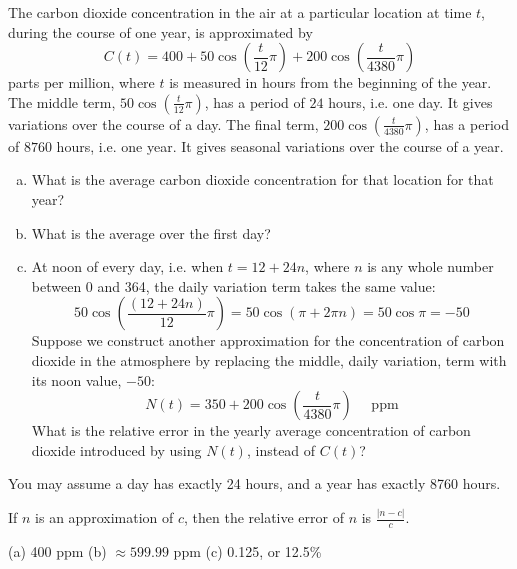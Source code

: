 \begin{Mquestion}
The carbon dioxide concentration in the air at a particular location at time $t$, during the course of one year, is approximated by \[C(t) = 400+50\cos\left(\frac{t}{12}\pi\right)+200\cos\left(\frac{t}{4380}\pi\right)\] parts per million, where  $t$ is measured in hours from the beginning of the year. 
The middle term, $50\cos\left(\frac{t}{12}\pi\right)$, has a period of $24$ hours, i.e. one day. It gives variations
over the course of a day.
The final term, $200\cos\left(\frac{t}{4380}\pi\right)$, has a period of $8760$ hours, i.e. one year. It gives 
seasonal variations over the course of a year.
\begin{enumerate}[(a)]
\item  What is the average carbon dioxide concentration for that location for that year?
\item What is the average over the first day? 
\item At noon of every day, i.e. when $t=12+24n$, where $n$ is any whole number between 0 and 364,
the daily variation term takes the same value:
\[ 
50\cos\left(\frac{(12+24n)}{12}\pi\right) = 50\cos\left(\pi+2\pi n\right) = 50\cos\pi=-50
\]
Suppose we construct another approximation for the concentration of carbon dioxide in the atmosphere by replacing the 
middle, daily variation, term with its noon value, $-50$:
\[N(t) = 350 +200\cos\left(\frac{t}{4380}\pi\right)\quad\text{ ppm}\]
What is the relative error in the yearly average concentration of carbon dioxide introduced by using $N(t)$, instead of $C(t)$?
\end{enumerate}
You may assume a day has exactly 24 hours, and a year has exactly 8760 hours.
\end{Mquestion}
\begin{hint}
If $n$ is an approximation of $c$, then the relative error of $n$ is $\frac{|n-c|}{c}$.
\end{hint}
\begin{answer}
(a) 400 ppm \qquad (b) $\approx 599.99$ ppm
\qquad (c) 0.125, or 12.5\%
\end{answer}
